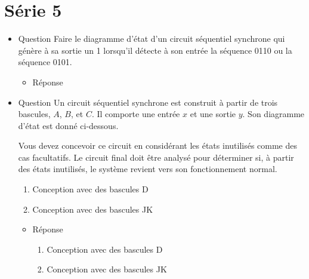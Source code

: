 \documentclass[letter, oneside]{book}
\begin{document}
\section*{Série 5}
\label{sec:org3942838}
\begin{itemize}
\item Question
\label{sec:orgb0e4558}
Faire le diagramme d'état d'un circuit séquentiel synchrone qui génère
à sa sortie un 1 lorsqu'il détecte à son entrée la séquence 0110 ou la
séquence 0101.

\begin{itemize}
\item Réponse
\label{sec:orga1bcde5}
\begin{center}

\end{center}
\end{itemize}

\item Question
\label{sec:org45706fb}
Un circuit séquentiel synchrone est construit à partir de trois
bascules, \(A\), \(B\), et \(C\). Il comporte une entrée \(x\) et
une sortie \(y\). Son diagramme d'état est donné ci-dessous. 
\begin{center}

\end{center}

Vous devez concevoir ce circuit en considérant les états inutilisés
comme des cas facultatifs. Le circuit final doit être analysé pour
déterminer si, à partir des états inutilisés, le système revient vers
son fonctionnement normal.
\begin{enumerate}
\item Conception avec des bascules D
\item Conception avec des bascules JK
\end{enumerate}

\begin{itemize}
\item Réponse
\label{sec:org6af7716}
\begin{enumerate}
\item Conception avec des bascules D

\begin{center}

\end{center}

\item Conception avec des bascules JK

\begin{center}

\end{center}
\end{enumerate}
\end{itemize}


\end{itemize}
\end{document}
